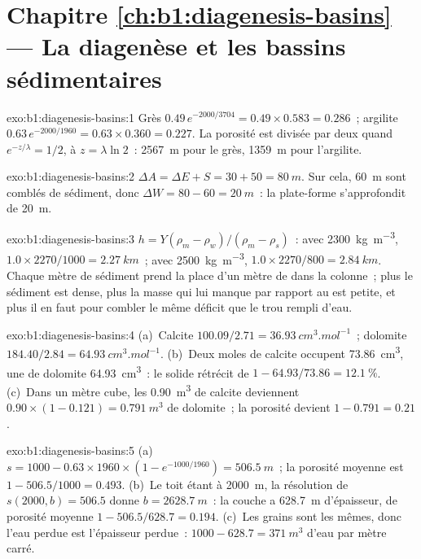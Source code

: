 \section*{Chapitre \ref{ch:b1:diagenesis-basins} --- La diagenèse et les bassins sédimentaires}

\begin{solution}{exo:b1:diagenesis-basins:1}
Grès $0.49\,e^{-2000/3704} = 0.49\times0.583 = \num{0.286}$~; argilite
$0.63\,e^{-2000/1960} = 0.63\times0.360 = \num{0.227}$. La porosité est divisée par deux quand
$e^{-z/\lambda} = 1/2$, à $z = \lambda\ln 2$~: \qty{2567}{m} pour le grès,
\qty{1359}{m} pour l'argilite.
\end{solution}

\begin{solution}{exo:b1:diagenesis-basins:2}
$\Delta A = \Delta E + S = 30 + 50 = \qty{80}{m}$. Sur cela, \qty{60}{m} sont comblés
de sédiment, donc $\Delta W = 80 - 60 = \qty{20}{m}$~: la plate-forme s'approfondit de
\qty{20}{m}.
\end{solution}

\begin{solution}{exo:b1:diagenesis-basins:3}
$h = Y(\rho_m - \rho_w)/(\rho_m - \rho_s)$~: avec \qty{2300}{kg.m^{-3}},
$1.0\times2270/1000 = \qty{2.27}{km}$~; avec \qty{2500}{kg.m^{-3}},
$1.0\times2270/800 = \qty{2.84}{km}$. Chaque mètre de sédiment prend la place d'un
mètre de  dans la colonne~; plus le sédiment est dense, plus la masse
qui lui manque par rapport au  est petite, et plus il en faut pour combler
le même déficit que le trou rempli d'eau.
\end{solution}

\begin{solution}{exo:b1:diagenesis-basins:4}
(a)~Calcite $100.09/2.71 = \qty{36.93}{cm^3.mol^{-1}}$~; dolomite $184.40/2.84
= \qty{64.93}{cm^3.mol^{-1}}$. (b)~Deux moles de calcite occupent
\qty{73.86}{cm^3}, une de dolomite \qty{64.93}{cm^3}~: le solide rétrécit de
$1 - 64.93/73.86 = \qty{12.1}{\%}$. (c)~Dans un mètre cube, les \qty{0.90}{m^3}
de calcite deviennent $0.90\times(1 - 0.121) = \qty{0.791}{m^3}$ de dolomite~; la
porosité devient $1 - 0.791 = \num{0.21}$.
\end{solution}

\begin{solution}{exo:b1:diagenesis-basins:5}
(a)~$s = 1000 - 0.63\times1960\times(1 - e^{-1000/1960}) = \qty{506.5}{m}$~; la
porosité moyenne est $1 - 506.5/1000 = \num{0.493}$. (b)~Le toit étant à
\qty{2000}{m}, la résolution de $s(2000, b) = 506.5$ donne $b = \qty{2628.7}{m}$~: la
couche a \qty{628.7}{m} d'épaisseur, de porosité moyenne $1 - 506.5/628.7 = \num{0.194}$.
(c)~Les grains sont les mêmes, donc l'eau perdue est l'épaisseur perdue~:
$1000 - 628.7 = \qty{371}{m^3}$ d'eau par mètre carré.
\end{solution}

